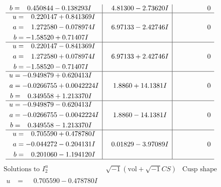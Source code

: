 \documentclass[1p]{elsarticle_modified}
\theoremstyle{definition}
\newcommand{\I}{\sqrt{-1}}
\begin{document}
$$\begin{array}{c|c|c}
\begin{aligned}
b &= \phantom{-}0.450844 - 0.138293 I\end{aligned}
 & \phantom{-}4.81300 - 2.73620 I & \phantom{-0.000000 } 0 \\ \hline\begin{aligned}
u &= \phantom{-}0.220147 + 0.841369 I \\
a &= \phantom{-}1.272580 - 0.078974 I \\
b &= -1.58520 + 0.71407 I\end{aligned}
 & \phantom{-}6.97133 - 2.42746 I & \phantom{-0.000000 } 0 \\ \hline\begin{aligned}
u &= \phantom{-}0.220147 - 0.841369 I \\
a &= \phantom{-}1.272580 + 0.078974 I \\
b &= -1.58520 - 0.71407 I\end{aligned}
 & \phantom{-}6.97133 + 2.42746 I & \phantom{-0.000000 } 0 \\ \hline\begin{aligned}
u &= -0.949879 + 0.620413 I \\
a &= -0.0266755 + 0.0042224 I \\
b &= \phantom{-}0.349558 + 1.213370 I\end{aligned}
 & \phantom{-}1.8860 + 14.1381 I & \phantom{-0.000000 } 0 \\ \hline\begin{aligned}
u &= -0.949879 - 0.620413 I \\
a &= -0.0266755 - 0.0042224 I \\
b &= \phantom{-}0.349558 - 1.213370 I\end{aligned}
 & \phantom{-}1.8860 - 14.1381 I & \phantom{-0.000000 } 0 \\ \hline\begin{aligned}
u &= \phantom{-}0.705590 + 0.478780 I \\
a &= -0.044272 - 0.204131 I \\
b &= \phantom{-}0.201060 - 1.194120 I\end{aligned}
 & \phantom{-}0.01829 - 3.97089 I & \phantom{-0.000000 } 0\\
 \hline 
 \end{array}$$\newpage$$\begin{array}{c|c|c}  
\text{Solutions to }I^u_{2}& \I (\text{vol} + \sqrt{-1}CS) & \text{Cusp shape}\\
 \hline 
\begin{aligned}
u &= \phantom{-}0.705590 - 0.478780 I \\

\end{aligned}
\end{array}$$
\end{document}
